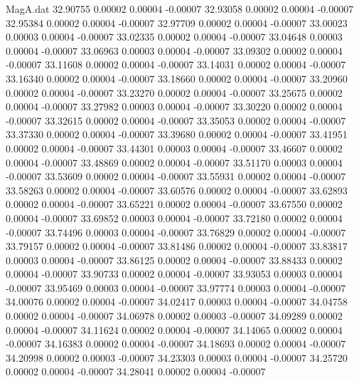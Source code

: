 \begin{filecontents}{MagA.dat}
  32.90755    0.00002    0.00004   -0.00007
  32.93058    0.00002    0.00004   -0.00007
  32.95384    0.00002    0.00004   -0.00007
  32.97709    0.00002    0.00004   -0.00007
  33.00023    0.00003    0.00004   -0.00007
  33.02335    0.00002    0.00004   -0.00007
  33.04648    0.00003    0.00004   -0.00007
  33.06963    0.00003    0.00004   -0.00007
  33.09302    0.00002    0.00004   -0.00007
  33.11608    0.00002    0.00004   -0.00007
  33.14031    0.00002    0.00004   -0.00007
  33.16340    0.00002    0.00004   -0.00007
  33.18660    0.00002    0.00004   -0.00007
  33.20960    0.00002    0.00004   -0.00007
  33.23270    0.00002    0.00004   -0.00007
  33.25675    0.00002    0.00004   -0.00007
  33.27982    0.00003    0.00004   -0.00007
  33.30220    0.00002    0.00004   -0.00007
  33.32615    0.00002    0.00004   -0.00007
  33.35053    0.00002    0.00004   -0.00007
  33.37330    0.00002    0.00004   -0.00007
  33.39680    0.00002    0.00004   -0.00007
  33.41951    0.00002    0.00004   -0.00007
  33.44301    0.00003    0.00004   -0.00007
  33.46607    0.00002    0.00004   -0.00007
  33.48869    0.00002    0.00004   -0.00007
  33.51170    0.00003    0.00004   -0.00007
  33.53609    0.00002    0.00004   -0.00007
  33.55931    0.00002    0.00004   -0.00007
  33.58263    0.00002    0.00004   -0.00007
  33.60576    0.00002    0.00004   -0.00007
  33.62893    0.00002    0.00004   -0.00007
  33.65221    0.00002    0.00004   -0.00007
  33.67550    0.00002    0.00004   -0.00007
  33.69852    0.00003    0.00004   -0.00007
  33.72180    0.00002    0.00004   -0.00007
  33.74496    0.00003    0.00004   -0.00007
  33.76829    0.00002    0.00004   -0.00007
  33.79157    0.00002    0.00004   -0.00007
  33.81486    0.00002    0.00004   -0.00007
  33.83817    0.00003    0.00004   -0.00007
  33.86125    0.00002    0.00004   -0.00007
  33.88433    0.00002    0.00004   -0.00007
  33.90733    0.00002    0.00004   -0.00007
  33.93053    0.00003    0.00004   -0.00007
  33.95469    0.00003    0.00004   -0.00007
  33.97774    0.00003    0.00004   -0.00007
  34.00076    0.00002    0.00004   -0.00007
  34.02417    0.00003    0.00004   -0.00007
  34.04758    0.00002    0.00004   -0.00007
  34.06978    0.00002    0.00003   -0.00007
  34.09289    0.00002    0.00004   -0.00007
  34.11624    0.00002    0.00004   -0.00007
  34.14065    0.00002    0.00004   -0.00007
  34.16383    0.00002    0.00004   -0.00007
  34.18693    0.00002    0.00004   -0.00007
  34.20998    0.00002    0.00003   -0.00007
  34.23303    0.00003    0.00004   -0.00007
  34.25720    0.00002    0.00004   -0.00007
  34.28041    0.00002    0.00004   -0.00007

\end{filecontents}
